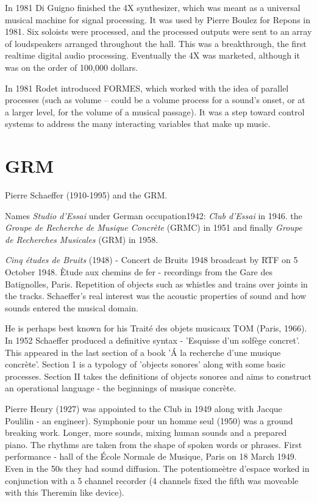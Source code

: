 In 1981 Di Guigno finished the 4X synthesizer, which was meant as a universal musical machine for signal processing. It was used by Pierre Boulez for Repons in 1981. Six soloists were processed, and the processed outputs were sent to an array of loudspeakers arranged throughout the hall. This was a breakthrough, the first realtime digital audio processing. Eventually the 4X was marketed, although it was on the order of 100,000 dollars.

In 1981 Rodet introduced FORMES, which worked with the idea of parallel processes (such as volume -- could be a volume process for a sound's onset, or at a larger level, for the volume of a musical passage). It was a step toward control systems to address the many interacting variables that make up music.

\section{GRM}

Pierre Schaeffer (1910-1995) and the GRM.

Names \textit{Studio d'Essai} under German occupation1942: \textit{Club d'Essai} in 1946. the \textit{Groupe
de Recherche de Musique Concr\`ete} (GRMC) in 1951 and finally \textit{Groupe de Recherches Musicales} (GRM) in 1958.

\textit{Cinq \'etudes de Bruits} (1948) - Concert de Bruits 1948 broadcast by RTF on 5 October 1948. \`Etude aux chemins de fer - recordings from the Gare des Batignolles, Paris. Repetition of objects such as whistles and trains over joints in the tracks. Schaeffer's real interest was the acoustic properties of sound and how sounds entered the musical domain.

He is perhaps best known for his Trait\'e des objets musicaux TOM (Paris, 1966). In 1952 Schaeffer produced a definitive syntax - 'Esquisse d'un solf\`ege concret'. This appeared in the last section of a book 'Á la recherche d'une musique concr\`ete'. Section 1
is a typology of 'objects sonores' along with some basic processes. Section II takes the definitions of objects sonores and aims to construct an operational language - the beginnings of musique concr\`ete.

Pierre Henry (1927) was appointed to the Club in 1949 along with Jacque Poulilin - an engineer). Symphonie pour un homme seul (1950) was a ground breaking work. Longer, more sounds, mixing human sounds and a prepared piano. The rhythms are taken from
the shape of spoken words or phrases. First performance - hall of the \'Ecole Normale de Musique, Paris on 18 March 1949. Even in the 50s they had sound diffusion. The potentiomeètre d'espace worked in conjunction with a 5 channel recorder (4 channels
fixed the fifth was moveable with this Theremin like device).

